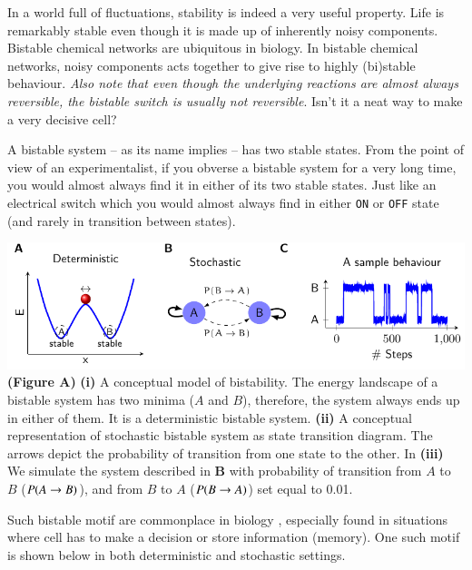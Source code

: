 \documentclass[]{resonance}
\begin{document}
{
    In a world full of fluctuations, stability is indeed a very useful property.
    Life is remarkably stable even though it is made up of inherently noisy
    components. Bistable chemical networks are ubiquitous in biology. In
    bistable chemical networks, noisy components acts together to give rise to 
    highly (bi)stable behaviour. \emph{Also note that even though the underlying
    reactions are almost always reversible, the bistable switch is usually not
    reversible}. Isn't it a neat way to make a very decisive cell?

    A bistable system -- as its name implies -- has two stable states. From the
    point of view of an experimentalist, if you obverse a bistable system for
    a very long time, you would almost always find it in either of its two stable
    states. Just like an electrical switch which you would almost always find in
    either \texttt{ON} or \texttt{OFF} state (and rarely in transition between
    states).

    \vspace{2mm} 
    \includegraphics[width=\linewidth]{./stability_noise.pdf} 
    {\footnotesize \textbf{(Figure A)} 
        \textbf{(i)} A conceptual model of bistability.  The
        energy landscape of a bistable system has two minima ($A$ and
        $B$), therefore, the system always ends up in either of them. It is a
        deterministic bistable system. \textbf{(ii)} A conceptual representation
        of stochastic bistable system as state transition diagram.  The arrows
        depict the probability of transition from one state to the other. In
        \textbf{(iii)} We simulate the system described in $\textbf{B}$ with probability
        of transition from $A$ to $B$ ($P(A\protect\rightarrow B)$), and from
        $B$ to $A$ ($P(B\protect\rightarrow A)$) set equal to 0.01.
    }

    \vspace{2mm}
    Such bistable motif are commonplace in biology \cite{ramakrishnan2008},
    especially found in situations where cell has to make a decision or store
    information (memory). One such motif is shown below in both deterministic
    and stochastic settings. 

}
\end{document}
